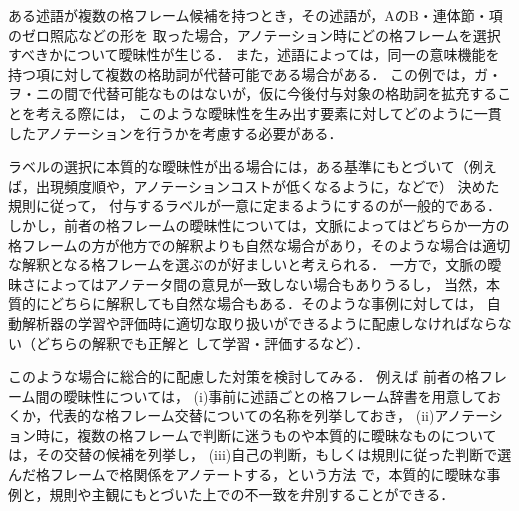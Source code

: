 \documentclass[japanese]{jnlp_1.4}
\begin{document}
ある述語が複数の格フレーム候補を持つとき，その述語が，AのB・連体節・項のゼロ照応などの形を
取った場合，アノテーション時にどの格フレームを選択すべきかについて曖昧性が生じる．
また，述語によっては，同一の意味機能を持つ項に対して複数の格助詞が代替可能である場合がある．
この例では，ガ・ヲ・ニの間で代替可能なものはないが，仮に今後付与対象の格助詞を拡充することを考える際には，
このような曖昧性を生み出す要素に対してどのように一貫したアノテーションを行うかを考慮する必要がある．


ラベルの選択に本質的な曖昧性が出る場合には，ある基準にもとづいて（例えば，出現頻度順や，アノテーションコストが低くなるように，などで）
決めた規則に従って，
付与するラベルが一意に定まるようにするのが一般的である．
しかし，前者の格フレームの曖昧性については，文脈によってはどちらか一方の格フレームの方が他方での解釈よりも自然な場合があり，そのような場合は適切な解釈となる格フレームを選ぶのが好ましいと考えられる．
一方で，文脈の曖昧さによってはアノテータ間の意見が一致しない場合もありうるし，
当然，本質的にどちらに解釈しても自然な場合もある．そのような事例に対しては，
自動解析器の学習や評価時に適切な取り扱いができるように配慮しなければならない（どちらの解釈でも正解と
して学習・評価するなど）．

このような場合に総合的に配慮した対策を検討してみる．
例えば
前者の格フレーム間の曖昧性については，
(i)事前に述語ごとの格フレーム辞書を用意しておくか，代表的な格フレーム交替についての名称を列挙しておき，
(ii)アノテーション時に，複数の格フレームで判断に迷うものや本質的に曖昧なものについては，その交替の候補を列挙し，
(iii)自己の判断，もしくは規則に従った判断で選んだ格フレームで格関係をアノテートする，という方法
で，本質的に曖昧な事例と，規則や主観にもとづいた上での不一致を弁別することができる．
\end{document}
